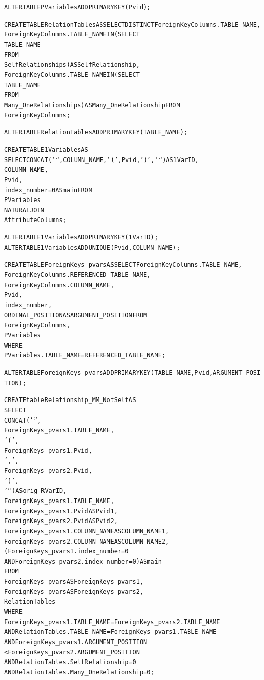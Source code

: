 \documentclass{sfuthesis}
\begin{document}
\begin{appendices}
\begin{alltt}
ALTER TABLE PVariables ADD PRIMARY KEY (Pvid);

CREATE TABLE RelationTables AS SELECT DISTINCT ForeignKeyColumns.TABLE_NAME,
ForeignKeyColumns.TABLE_NAME IN (SELECT 
        TABLE_NAME
    FROM
        SelfRelationships) AS SelfRelationship,
ForeignKeyColumns.TABLE_NAME IN (SELECT 
        TABLE_NAME
    FROM
        Many_OneRelationships) AS Many_OneRelationship FROM
ForeignKeyColumns;

ALTER TABLE RelationTables ADD PRIMARY KEY (TABLE_NAME);

CREATE TABLE 1Variables AS
 SELECT CONCAT('`', COLUMN_NAME, '(', Pvid, ')', '`') AS 1VarID,
COLUMN_NAME,
Pvid,
index_number = 0 AS main FROM
PVariables
    NATURAL JOIN
AttributeColumns;

ALTER TABLE 1Variables ADD PRIMARY KEY (1VarID);
ALTER TABLE 1Variables ADD UNIQUE(Pvid,COLUMN_NAME);

CREATE TABLE ForeignKeys_pvars AS SELECT ForeignKeyColumns.TABLE_NAME,
ForeignKeyColumns.REFERENCED_TABLE_NAME,
ForeignKeyColumns.COLUMN_NAME,
Pvid,
index_number,
ORDINAL_POSITION AS ARGUMENT_POSITION FROM
ForeignKeyColumns,
PVariables
WHERE
PVariables.TABLE_NAME = REFERENCED_TABLE_NAME;

ALTER TABLE ForeignKeys_pvars ADD PRIMARY KEY (TABLE_NAME,Pvid,ARGUMENT_POSITION);

CREATE table Relationship_MM_NotSelf AS
SELECT 
    CONCAT('`',
            ForeignKeys_pvars1.TABLE_NAME,
            '(',
            ForeignKeys_pvars1.Pvid,
            ',',
            ForeignKeys_pvars2.Pvid,
            ')',
            '`') AS orig_RVarID,
    ForeignKeys_pvars1.TABLE_NAME,
    ForeignKeys_pvars1.Pvid AS Pvid1,
    ForeignKeys_pvars2.Pvid AS Pvid2,
    ForeignKeys_pvars1.COLUMN_NAME AS COLUMN_NAME1,
    ForeignKeys_pvars2.COLUMN_NAME AS COLUMN_NAME2,
    (ForeignKeys_pvars1.index_number = 0
        AND ForeignKeys_pvars2.index_number = 0) AS main
FROM
    ForeignKeys_pvars AS ForeignKeys_pvars1,
    ForeignKeys_pvars AS ForeignKeys_pvars2,
    RelationTables
WHERE
    ForeignKeys_pvars1.TABLE_NAME = ForeignKeys_pvars2.TABLE_NAME
        AND RelationTables.TABLE_NAME = ForeignKeys_pvars1.TABLE_NAME
        AND ForeignKeys_pvars1.ARGUMENT_POSITION 
        		    < ForeignKeys_pvars2.ARGUMENT_POSITION
        AND RelationTables.SelfRelationship = 0
        AND RelationTables.Many_OneRelationship = 0;


\end{alltt}
\end{appendices}
\end{document}
